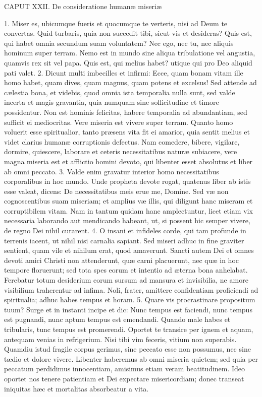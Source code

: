\documentclass[twoside]{article}
\begin{document}
CAPUT XXII.
De consideratione humanæ miseriæ

1. Miser es, ubicumque fueris et quocumque te verteris, nisi ad Deum te convertas. Quid turbaris, quia non succedit tibi, sicut vis et desideras? Quis est, qui habet omnia secundum suam voluntatem? Nec ego, nec tu, nec aliquis hominum super terram. Nemo est in mundo sine aliqua tribulatione vel angustia, quamvis rex sit vel papa. Quis est, qui melius habet? utique qui pro Deo aliquid pati valet.
2. Dicunt multi imbecilles et infirmi: Ecce, quam bonam vitam ille homo habet, quam dives, quam magnus, quam potens et excelsus! Sed attende ad cælestia bona, et videbis, quod omnia ista temporalia nulla sunt, sed valde incerta et magis gravantia, quia numquam sine sollicitudine et timore possidentur. Non est hominis felicitas, habere temporalia ad abundantiam, sed sufficit ei mediocritas. Vere miseria est vivere super terram. Quanto homo voluerit esse spiritualior, tanto præsens vita fit ei amarior, quia sentit melius et videt clarius humanæ corruptionis defectus. Nam comedere, bibere, vigilare, dormire, quiescere, laborare et ceteris necessitatibus naturæ subiacere, vere magna miseria est et afflictio homini devoto, qui libenter esset absolutus et liber ab omni peccato.
3. Valde enim gravatur interior homo necessitatibus corporalibus in hoc mundo. Unde propheta devote rogat, quatenus liber ab istis esse valeat, dicens: De necessitatibus meis erue me, Domine. Sed væ non cognoscentibus suam miseriam; et amplius væ illis, qui diligunt hanc miseram et corruptibilem vitam. Nam in tantum quidam hanc amplectuntur, licet etiam vix necessaria laborando aut mendicando habeant, ut, si possent hic semper vivere, de regno Dei nihil curarent.
4. O insani et infideles corde, qui tam profunde in terrenis iacent, ut nihil nisi carnalia sapiant. Sed miseri adhuc in fine graviter sentient, quam vile et nihilum erat, quod amaverunt. Sancti autem Dei et omnes devoti amici Christi non attenderunt, quæ carni placuerunt, nec quæ in hoc tempore floruerunt; sed tota spes eorum et intentio ad æterna bona anhelabat. Ferebatur totum desiderium eorum sursum ad mansura et invisibilia, ne amore visibilium traherentur ad infima. Noli, frater, amittere confidentiam proficiendi ad spiritualia; adhuc habes tempus et horam.
5. Quare vis procrastinare propositum tuum? Surge et in instanti incipe et dic: Nunc tempus est faciendi, nunc tempus est pugnandi, nunc aptum tempus est emendandi. Quando male habes et tribularis, tunc tempus est promerendi. Oportet te transire per ignem et aquam, antequam venias in refrigerium. Nisi tibi vim feceris, vitium non superabis. Quamdiu istud fragile corpus gerimus, sine peccato esse non possumus, nec sine tædio et dolore vivere. Libenter haberemus ab omni miseria quietem; sed quia per peccatum perdidimus innocentiam, amisimus etiam veram beatitudinem. Ideo oportet nos tenere patientiam et Dei expectare misericordiam; donec transeat iniquitas hæc et mortalitas absorbeatur a vita.
\end{document}
